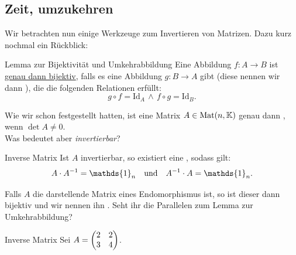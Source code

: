 \subsection{Zeit, umzukehren}
Wir betrachten nun einige Werkzeuge zum Invertieren von Matrizen. Dazu kurz nochmal ein Rückblick:
\begin{Wiederholung}{Lemma zur Bijektivität und Umkehrabbildung}\label{satz:BijektivitatUmkehrabbildung}
Eine Abbildung $f:A\rightarrow B$ ist \underline{genau dann bijektiv}, falls es eine Abbildung $g:B\to A$ gibt (diese nennen wir dann ), die die folgenden Relationen erfüllt:
\begin{equation}
    g\circ f=\text{Id}_A\,\wedge\, f\circ g=\text{Id}_B.\label{eq:Umkehrabbildung}
\end{equation}
\end{Wiederholung}
Wie wir schon festgestellt hatten, ist eine Matrix $A\in\text{Mat}(n,\mathbb{K})$ genau dann , wenn $\det A\neq 0$.\\
Was bedeutet aber \textit{invertierbar}?
\begin{Wiederholung}{Inverse Matrix}
Ist $A$ invertierbar, so existiert eine , sodass gilt:
\begin{equation}
    A\cdot A^{-1}=\mathds{1}_n\quad\tx{und}\quad A^{-1}\cdot A=\mathds{1}_n.
\end{equation}
\end{Wiederholung}
Falls $A$ die darstellende Matrix eines Endomorphismus ist, so ist dieser dann bijektiv und wir nennen ihn . Seht ihr die Parallelen zum Lemma zur Umkehrabbildung?\
\begin{Beispiel}{Inverse Matrix}
Sei $A=\begin{pmatrix}2&2\\3&4\end{pmatrix}$.\\
\end{Beispiel}

